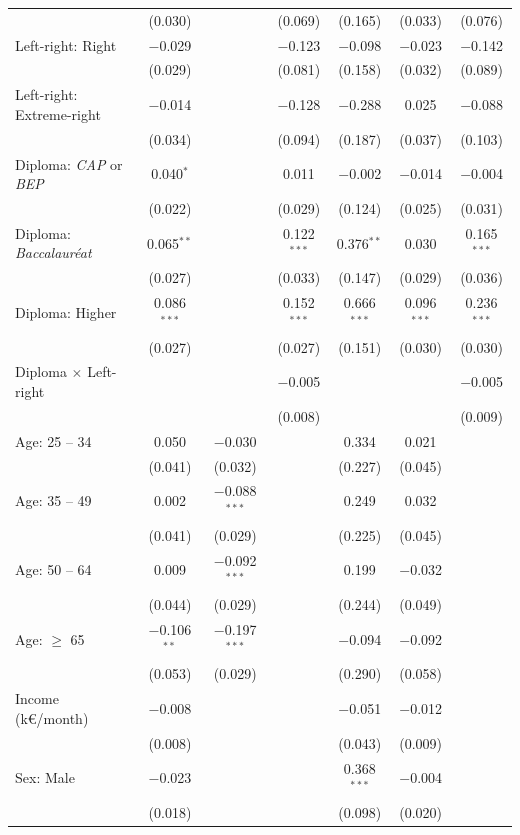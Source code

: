 \documentclass[english,5p,authoryear]{elsarticle}
\begin{document}
\begin{table}[!htbp]
{\begin{tabular}{@{\extracolsep{5pt}}lcccccc}
  & (0.030) &  & (0.069) & (0.165) & (0.033) & (0.076) \\ 
  Left-right: Right & $-$0.029 &  & $-$0.123 & $-$0.098 & $-$0.023 & $-$0.142 \\ 
  & (0.029) &  & (0.081) & (0.158) & (0.032) & (0.089) \\ 
  Left-right: Extreme-right & $-$0.014 &  & $-$0.128 & $-$0.288 & 0.025 & $-$0.088 \\ 
  & (0.034) &  & (0.094) & (0.187) & (0.037) & (0.103) \\ 
  Diploma: \textit{CAP} or \textit{BEP} & 0.040$^{*}$ &  & 0.011 & $-$0.002 & $-$0.014 & $-$0.004 \\ 
  & (0.022) &  & (0.029) & (0.124) & (0.025) & (0.031) \\ 
  Diploma: \textit{Baccalauréat} & 0.065$^{**}$ &  & 0.122$^{***}$ & 0.376$^{**}$ & 0.030 & 0.165$^{***}$ \\ 
  & (0.027) &  & (0.033) & (0.147) & (0.029) & (0.036) \\ 
  Diploma: Higher & 0.086$^{***}$ &  & 0.152$^{***}$ & 0.666$^{***}$ & 0.096$^{***}$ & 0.236$^{***}$ \\ 
  & (0.027) &  & (0.027) & (0.151) & (0.030) & (0.030) \\ 
  Diploma $\times$ Left-right &  &  & $-$0.005 &  &  & $-$0.005 \\ 
  &  &  & (0.008) &  &  & (0.009) \\ 
  Age: 25 -- 34 & 0.050 & $-$0.030 &  & 0.334 & 0.021 &  \\ 
  & (0.041) & (0.032) &  & (0.227) & (0.045) &  \\ 
  Age: 35 -- 49 & 0.002 & $-$0.088$^{***}$ &  & 0.249 & 0.032 &  \\ 
  & (0.041) & (0.029) &  & (0.225) & (0.045) &  \\ 
  Age: 50 -- 64 & 0.009 & $-$0.092$^{***}$ &  & 0.199 & $-$0.032 &  \\ 
  & (0.044) & (0.029) &  & (0.244) & (0.049) &  \\ 
  Age: $\geq$ 65 & $-$0.106$^{**}$ & $-$0.197$^{***}$ &  & $-$0.094 & $-$0.092 &  \\ 
  & (0.053) & (0.029) &  & (0.290) & (0.058) &  \\ 
  Income (k\euro{}/month) & $-$0.008 &  &  & $-$0.051 & $-$0.012 &  \\ 
  & (0.008) &  &  & (0.043) & (0.009) &  \\ 
  Sex: Male & $-$0.023 &  &  & 0.368$^{***}$ & $-$0.004 &  \\ 
  & (0.018) &  &  & (0.098) & (0.020) &  \\ 

\end{tabular}}
\end{table}
\end{document}
